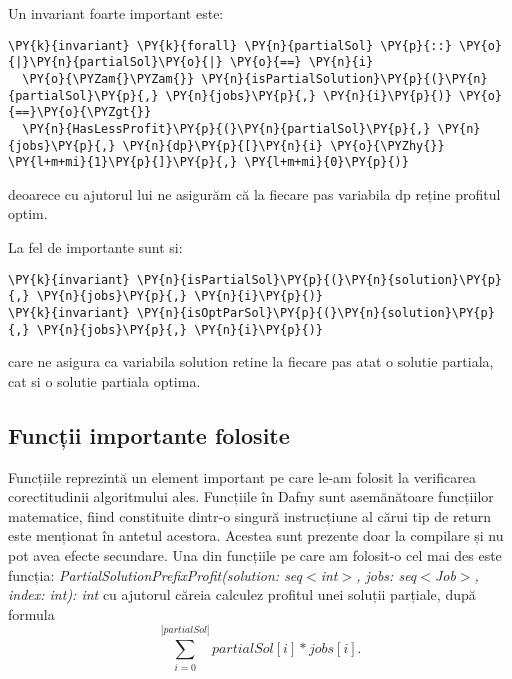 Un invariant foarte important este:
\begin{Verbatim}[commandchars=\\\{\}, fontsize=\small]
\PY{k}{invariant} \PY{k}{forall} \PY{n}{partialSol} \PY{p}{::} \PY{o}{|}\PY{n}{partialSol}\PY{o}{|} \PY{o}{==} \PY{n}{i}
  \PY{o}{\PYZam{}\PYZam{}} \PY{n}{isPartialSolution}\PY{p}{(}\PY{n}{partialSol}\PY{p}{,} \PY{n}{jobs}\PY{p}{,} \PY{n}{i}\PY{p}{)} \PY{o}{==}\PY{o}{\PYZgt{}} 
  \PY{n}{HasLessProfit}\PY{p}{(}\PY{n}{partialSol}\PY{p}{,} \PY{n}{jobs}\PY{p}{,} \PY{n}{dp}\PY{p}{[}\PY{n}{i} \PY{o}{\PYZhy{}} \PY{l+m+mi}{1}\PY{p}{]}\PY{p}{,} \PY{l+m+mi}{0}\PY{p}{)}
\end{Verbatim}
deoarece cu ajutorul lui ne asigurăm că la fiecare pas variabila dp reține profitul optim. 

La fel de importante sunt si:
\begin{Verbatim}[commandchars=\\\{\}, fontsize=\small]
\PY{k}{invariant} \PY{n}{isPartialSol}\PY{p}{(}\PY{n}{solution}\PY{p}{,} \PY{n}{jobs}\PY{p}{,} \PY{n}{i}\PY{p}{)}
\PY{k}{invariant} \PY{n}{isOptParSol}\PY{p}{(}\PY{n}{solution}\PY{p}{,} \PY{n}{jobs}\PY{p}{,} \PY{n}{i}\PY{p}{)}
\end{Verbatim}

care ne asigura ca variabila solution retine la fiecare pas atat o solutie partiala, cat si o solutie partiala optima. 

\subsection{Funcții importante folosite}
Funcțiile reprezintă un element important pe care le-am folosit la verificarea corectitudinii algoritmului ales. 
Funcțiile în Dafny sunt asemănătoare funcțiilor matematice, fiind constituite dintr-o singură instrucțiune al cărui tip de return este menționat în antetul acestora. Acestea sunt prezente doar
la compilare și nu pot avea efecte secundare.\cite{DBLP:journals/jlap/BlazquezMS23}
Una din funcțiile pe care am folosit-o cel mai des este funcția: \textit{PartialSolutionPrefixProfit(solution: seq$<$int$>$, jobs: seq$<$Job$>$, index: int): int} cu ajutorul căreia calculez profitul unei soluții parțiale, după formula \[ \sum_{i=0}^{|partialSol|} partialSol[i] * jobs[i]. \]

